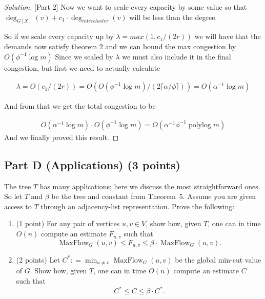 \documentclass[a4paper,11pt]{article}
\newcommand{\coloneqq}{\mathrel{\mathop:}=}
\DeclareMathOperator{\polylog}{polylog}
\DeclareMathOperator{\MaxFlow}{MaxFlow}
\DeclareMathOperator{\degG}{deg}
\newenvironment{solution}
  {\begin{proof}[Solution]}
  {\end{proof}}
\begin{document}
\begin{solution}[Part 2]
    Now we want to scale every capacity by some value so that $\degG_{G[X]} (v) + c_1 \cdot \degG _{intercluster} (v)$ will be less than the degree.

    So if we scale every capacity up by $\lambda = max(1, c_1/(2r))$ we will have that the demands now satisfy theorem $2$ and we can bound the max congestion by $O(\phi ^{-1} \log m)$ Since we scaled by $\lambda$ we must also include it in the final congestion, but first we need to actually calculate 

    \begin{align}
        \lambda = O(c_1/(2r)) = O(O(\phi ^{-1} \log m)/(2\lceil \alpha / \phi \rceil)) = O(\alpha ^{-1} \log m)
    \end{align}

    And from that we get the total congestion to be

    \begin{align}
        O(\alpha ^{-1} \log m) \cdot  O(\phi ^{-1} \log m) = O(\alpha ^{-1} \phi ^{-1} \polylog m)
    \end{align}
    And we finally proved this result.


    
\end{solution}




\subsection*{Part D (Applications) (3 points)}
The tree \(T\) has many applications; here we discuss the most straightforward ones. So let \(T\) and \(\beta\) be the tree and constant from Theorem~5. Assume you are given access to \(T\) through an adjacency-list representation. Prove the following:

\begin{enumerate}
    \item (1 point) For any pair of vertices \(u,v\in V\), show how, given \(T\), one can in time \(O(n)\) compute an estimate \(F_{u,v}\) such that
    \[
    \MaxFlow_G(u,v)\leq F_{u,v}\leq \beta \cdot \MaxFlow_G(u,v).
    \]
    \item (2 points) Let \(C^{*}\coloneqq \min_{u\neq v}\MaxFlow_G(u,v)\) be the global min-cut value of \(G\). Show how, given \(T\), one can in time \(O(n)\) compute an estimate \(C\) such that
    \[
    C^{*}\leq C\leq \beta \cdot C^{*}.
    \]
\end{enumerate}
\end{document}
